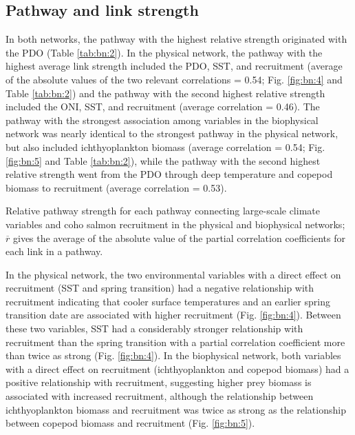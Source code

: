 \subsection{Pathway and link strength}

In both networks, the pathway with the highest relative strength originated with
the PDO (Table \ref{tab:bn:2}). In the physical network, the pathway with the
highest average link strength included the PDO, SST, and recruitment (average of
the absolute values of the two relevant correlations = 0.54; Fig. \ref{fig:bn:4}
and Table \ref{tab:bn:2}) and the pathway with the second highest relative
strength included the ONI, SST, and recruitment (average correlation = 0.46).
The pathway with the strongest association among variables in the biophysical
network was nearly identical to the strongest pathway in the physical network,
but also included ichthyoplankton biomass (average correlation = 0.54; Fig.
\ref{fig:bn:5} and Table \ref{tab:bn:2}), while the pathway with the second
highest relative strength went from the PDO through deep temperature and copepod
biomass to recruitment (average correlation = 0.53).

\begin{table}[htbp]
  \small \centering \libertineLF
  \caption[Relative pathway strength for each pathway connecting large-scale
           climate variables and coho salmon recruitment]{Relative pathway
           strength for each pathway connecting large-scale climate variables
           and coho salmon recruitment in the physical and biophysical networks;
           $\overline{r}$ gives the average of the absolute value of the partial
           correlation coefficients for each link in a pathway.}
  
  \label{tab:bn:2}
\end{table}

In the physical network, the two environmental variables with a direct effect on
recruitment (SST and spring transition) had a negative relationship with
recruitment indicating that cooler surface temperatures and an earlier spring
transition date are associated with higher recruitment (Fig. \ref{fig:bn:4}).
Between these two variables, SST had a considerably stronger relationship with
recruitment than the spring transition with a partial correlation coefficient
more than twice as strong (Fig. \ref{fig:bn:4}). In the biophysical network,
both variables with a direct effect on recruitment (ichthyoplankton and copepod
biomass) had a positive relationship with recruitment, suggesting higher prey
biomass is associated with increased recruitment, although the relationship
between ichthyoplankton biomass and recruitment was twice as strong as the
relationship between copepod biomass and recruitment (Fig. \ref{fig:bn:5}).


